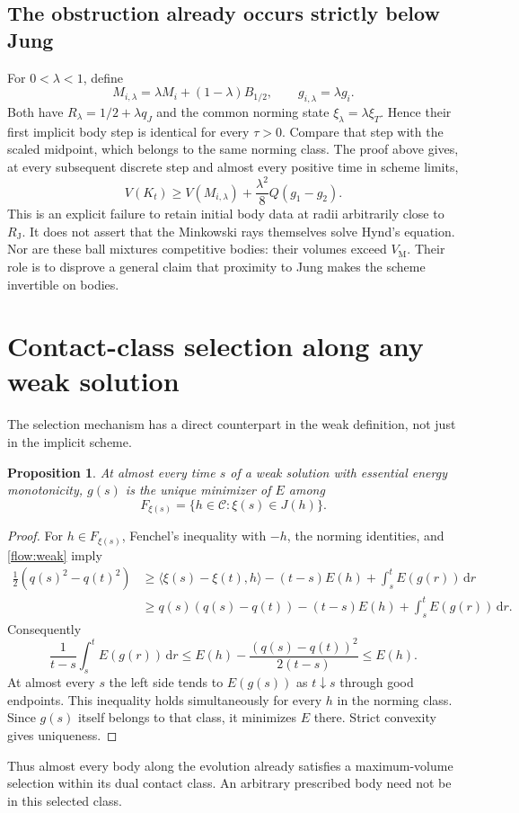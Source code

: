 \documentclass[11pt]{article}
\newtheorem{proposition}[theorem]{Proposition}
\theoremstyle{remark}\newtheorem{remark}[theorem]{Remark}
\newcommand{\VM}{V_{\mathrm M}}
\newcommand{\RJ}{R_{\mathrm J}}
\newcommand{\dd}{\,\mathrm d}
\newcommand{\C}{\mathcal C}
\begin{document}
\subsection{The obstruction already occurs strictly below Jung}
For $0<\lambda<1$, define
\[
 M_{i,\lambda}=\lambda M_i+(1-\lambda)B_{1/2},\qquad
 g_{i,\lambda}=\lambda g_i.
\]
Both have $R_\lambda=1/2+\lambda q_J$ and the common norming state
$\xi_\lambda=\lambda\xi_T$. Hence their first implicit body step is identical for every $\tau>0$. Compare that step with the scaled midpoint, which belongs to the same norming class. The proof above gives, at every subsequent discrete step and almost every positive time in scheme limits,
\begin{equation}\label{flow:scaledjump}
 V(K_t)\geq V(M_{i,\lambda})+\frac{\lambda^2}{8}Q(g_1-g_2).
\end{equation}
This is an explicit failure to retain initial body data at radii arbitrarily close to $\RJ$. It does not assert that the Minkowski rays themselves solve Hynd's equation. Nor are these ball mixtures competitive bodies: their volumes exceed $\VM$. Their role is to disprove a general claim that proximity to Jung makes the scheme invertible on bodies.

\section{Contact-class selection along any weak solution}
The selection mechanism has a direct counterpart in the weak definition, not just in the implicit scheme.
\begin{proposition}\label{flow:aselection}
At almost every time $s$ of a weak solution with essential energy monotonicity, $g(s)$ is the unique minimizer of $E$ among
\[
 F_{\xi(s)}=\{h\in\C:\xi(s)\in J(h)\}.
\]
\end{proposition}
\begin{proof}
For $h\in F_{\xi(s)}$, Fenchel's inequality with $-h$, the norming identities, and \eqref{flow:weak} imply
\begin{align*}
 \tfrac12(q(s)^2-q(t)^2)
 &\geq\langle\xi(s)-\xi(t),h\rangle-(t-s)E(h)+\int_s^t E(g(r))\dd r\\
 &\geq q(s)(q(s)-q(t))-(t-s)E(h)+\int_s^t E(g(r))\dd r.
\end{align*}
Consequently
\begin{equation}\label{flow:faceaverage}
 \frac1{t-s}\int_s^t E(g(r))\dd r
 \leq E(h)-\frac{(q(s)-q(t))^2}{2(t-s)}\leq E(h).
\end{equation}
At almost every $s$ the left side tends to $E(g(s))$ as $t\downarrow s$ through good endpoints. This inequality holds simultaneously for every $h$ in the norming class. Since $g(s)$ itself belongs to that class, it minimizes $E$ there. Strict convexity gives uniqueness.
\end{proof}
Thus almost every body along the evolution already satisfies a maximum-volume selection within its dual contact class. An arbitrary prescribed body need not be in this selected class.
\end{document}

